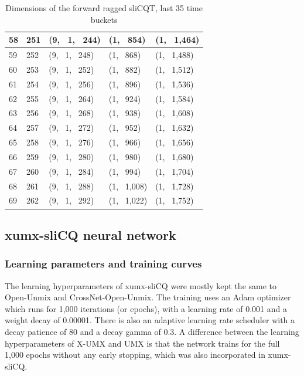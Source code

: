 \documentclass[report.tex]{subfiles}
\begin{document}
\begin{table}[ht]
\begin{tabular}{ |l|l|l|l|l| }
\hline
58 & 251 & (9, \ 1, \ 244) & (1, \ 854) & (1, \ 1,464) \\
\hline
59 & 252 & (9, \ 1, \ 248) & (1, \ 868) & (1, \ 1,488) \\
\hline
60 & 253 & (9, \ 1, \ 252) & (1, \ 882) & (1, \ 1,512) \\
\hline
61 & 254 & (9, \ 1, \ 256) & (1, \ 896) & (1, \ 1,536) \\
\hline
62 & 255 & (9, \ 1, \ 264) & (1, \ 924) & (1, \ 1,584) \\
\hline
63 & 256 & (9, \ 1, \ 268) & (1, \ 938) & (1, \ 1,608) \\
\hline
64 & 257 & (9, \ 1, \ 272) & (1, \ 952) & (1, \ 1,632) \\
\hline
65 & 258 & (9, \ 1, \ 276) & (1, \ 966) & (1, \ 1,656) \\
\hline
66 & 259 & (9, \ 1, \ 280) & (1, \ 980) & (1, \ 1,680) \\
\hline
67 & 260 & (9, \ 1, \ 284) & (1, \ 994) & (1, \ 1,704) \\
\hline
68 & 261 & (9, \ 1, \ 288) & (1, \ 1,008) & (1, \ 1,728) \\
\hline
69 & 262 & (9, \ 1, \ 292) & (1, \ 1,022) & (1, \ 1,752) \\
\hline
\end{tabular}
	\caption{Dimensions of the forward ragged sliCQT, last 35 time buckets}
	\label{table:slicqdim2}
\end{table}

\newpagefill

\subsection{xumx-sliCQ neural network}

\subsubsection{Learning parameters and training curves}

The learning hyperparameters of xumx-sliCQ were mostly kept the same to Open-Unmix and CrossNet-Open-Unmix. The training uses an Adam optimizer which runs for 1,000 iterations (or epochs), with a learning rate of 0.001 and a weight decay of 0.00001. There is also an adaptive learning rate scheduler with a decay patience of 80 and a decay gamma of 0.3. A difference between the learning hyperparameters of X-UMX and UMX is that the network trains for the full 1,000 epochs without any early stopping, which was also incorporated in xumx-sliCQ.
\end{document}
